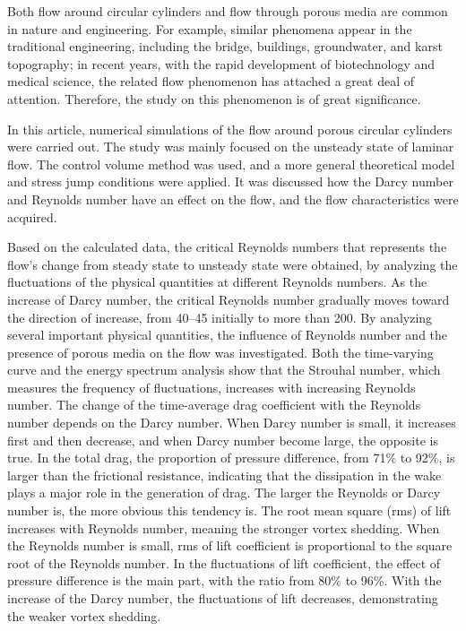 \begin{eabstract}
Both flow around circular cylinders and flow through porous media are common in nature and engineering. For example, similar phenomena appear in the traditional engineering, including the bridge, buildings, groundwater, and karst topography; in recent years, with the rapid development of biotechnology and medical science, the related flow phenomenon has attached a great deal of attention. Therefore, the study on this phenomenon is of great significance.

In this article, numerical simulations of the flow around porous circular cylinders were carried out. The study was mainly focused on the unsteady state of laminar flow. The control volume method was used, and a more general theoretical model and stress jump conditions were applied. It was discussed how the Darcy number and Reynolds number have an effect on the flow, and the flow characteristics were acquired.

Based on the calculated data, the critical Reynolds numbers that represents the flow's change from steady state to unsteady state were obtained, by analyzing the fluctuations of the physical quantities at different Reynolds numbers. As the increase of Darcy number, the critical Reynolds number gradually moves toward the direction of increase, from 40--45 initially to more than 200. By analyzing several important physical quantities, the influence of Reynolds number and the presence of porous media on the flow was investigated. Both the time-varying curve and the energy spectrum analysis show that the Strouhal number, which measures the frequency of fluctuations, increases with increasing Reynolds number. The change of the time-average drag coefficient with the Reynolds number depends on the Darcy number. When Darcy number is small, it increases first and then decrease, and when Darcy number become large, the opposite is true. In the total drag, the proportion of pressure difference, from 71\% to 92\%, is larger than the frictional resistance, indicating that the dissipation in the wake plays a major role in the generation of drag. The larger the Reynolds or Darcy number is, the more obvious this tendency is. The root mean square (rms) of lift increases with Reynolds number, meaning the stronger vortex shedding. When the Reynolds number is small, rms of lift coefficient is proportional to the square root of the Reynolds number. In the fluctuations of lift coefficient, the effect of pressure difference is the main part, with the ratio from 80\% to 96\%. With the increase of the Darcy number, the fluctuations of lift decreases, demonstrating the weaker vortex shedding.
\end{eabstract}
